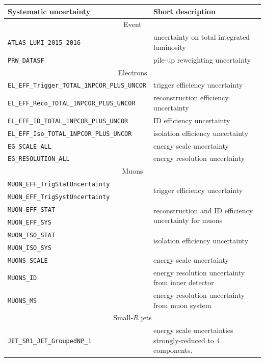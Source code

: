 \begin{table}
{\begin{tabular}{l|l}
\hline
Systematic uncertainty & Short description \\
\hline
\multicolumn{2}{c}{Event} \\
\hline
\texttt{ATLAS\_LUMI\_2015\_2016} & uncertainty on total integrated luminosity \\
\hline
\texttt{PRW\_DATASF} & pile-up reweighting uncertainty \\
\hline
\multicolumn{2}{c}{Electrons} \\
\hline
\texttt{EL\_EFF\_Trigger\_TOTAL\_1NPCOR\_PLUS\_UNCOR} &  trigger efficiency uncertainty \\
\texttt{EL\_EFF\_Reco\_TOTAL\_1NPCOR\_PLUS\_UNCOR}         &  reconstruction efficiency uncertainty \\
\texttt{EL\_EFF\_ID\_TOTAL\_1NPCOR\_PLUS\_UNCOR}         &  ID efficiency uncertainty \\
\texttt{EL\_EFF\_Iso\_TOTAL\_1NPCOR\_PLUS\_UNCOR}          &  isolation efficiency uncertainty \\
\texttt{EG\_SCALE\_ALL} &        energy scale uncertainty          \\        
\texttt{EG\_RESOLUTION\_ALL} &    energy resolution uncertainty    \\  
\hline
\multicolumn{2}{c}{Muons} \\
\hline
\texttt{MUON\_EFF\_TrigStatUncertainty} &  \multirow{2}{*}{trigger efficiency uncertainty} \\  
\texttt{MUON\_EFF\_TrigSystUncertainty} &  \\
\texttt{MUON\_EFF\_STAT} &  \multirow{2}{*}{reconstruction and ID efficiency uncertainty for muons}\\  
\texttt{MUON\_EFF\_SYS} &  \\
\texttt{MUON\_ISO\_STAT} &  \multirow{2}{*}{isolation efficiency uncertainty}\\  
\texttt{MUON\_ISO\_SYS} & \\            
\texttt{MUONS\_SCALE} &    energy scale uncertainty        \\                  
\texttt{MUONS\_ID} & energy resolution uncertainty from inner detector     \\                  
\texttt{MUONS\_MS} &  energy resolution uncertainty from muon system  \\
\hline
\multicolumn{2}{c}{Small-$R$ jets} \\
\hline
\texttt{JET\_SR1\_JET\_GroupedNP\_1} & \multirow{4}{*}{energy scale uncertainties strongly-reduced to 4 components.} \\

\end{tabular}}
\end{table}

